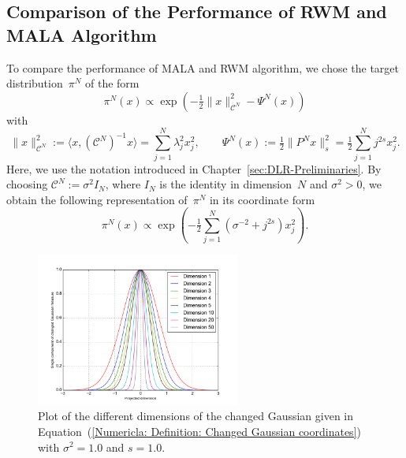 \subsection{Comparison of the Performance of RWM and MALA Algorithm}
\label{sec:sub:Numericals: Comparison MALA - RWM}

To compare the performance of MALA and RWM algorithm, we chose the target distribution~$\pi^N$ of the form
\begin{equation}
 \label{Numerical: Definition: Changed Gaussian}
 \pi^N (x) \varpropto \exp \left(- \tfrac{1}{2} \| x \|_{\mathcal{C}^N}^2 - \Psi^N (x) \right)
\end{equation}
with
\begin{equation}
 \label{Numerical: Definition: Psi^N and C^N}
 \| x \|_{\mathcal{C}^N}^2 := \langle x, (\mathcal{C}^N)^{-1}x \rangle = \sum_{j=1}^N \lambda_j^2 x_j^2, \qquad \Psi^N (x) := \tfrac{1}{2} \|P^N x \|^2_{s}=\tfrac{1}{2} \sum_{j=1}^{N} j^{2s}x_j^2.
\end{equation}
Here, we use the notation introduced in Chapter~\ref{sec:DLR-Preliminaries}. By choosing $\mathcal{C}^N := \sigma^2 I_N$, where $I_N$ is the identity in dimension~$N$ and $\sigma^2>0$, we obtain the following representation of~$\pi^N$ in its coordinate form
\begin{equation}
\label{Numericla: Definition: Changed Gaussian coordinates}
 \pi^N (x) \varpropto \exp \left( -\tfrac{1}{2} \sum_{j=1}^N ( \sigma^{-2} + j^{2s}) x_j^2   \right).
\end{equation}

\begin{figure}%
 \begin{center} 
  \includegraphics[width=0.60\textwidth]{figure_ChangedGaussian}
 \end{center}
  \caption{Plot of the different dimensions of the changed Gaussian given in Equation~(\ref{Numericla: Definition: Changed Gaussian coordinates}) with $\sigma^2 = 1.0$ and $s = 1.0$.}
  \label{fig:target: Changed Gaussian}
\end{figure}

